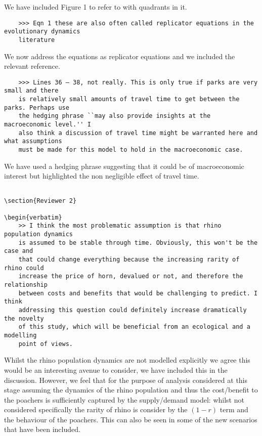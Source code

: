 \documentclass[10pt]{article}
\begin{document}
We have included Figure 1 to refer to with quadrants in it.

\begin{verbatim}
    >>> Eqn 1 these are also often called replicator equations in the evolutionary dynamics
    literature
\end{verbatim}

We now address the equations as replicator equations and we included the relevant
reference.

\begin{verbatim}
    >>> Lines 36 – 38, not really. This is only true if parks are very small and there
    is relatively small amounts of travel time to get between the parks. Perhaps use
    the hedging phrase ``may also provide insights at the macroeconomic level.'' I
    also think a discussion of travel time might be warranted here and what assumptions
    must be made for this model to hold in the macroeconomic case.
\end{verbatim}

We have used a hedging phrase suggesting that it could be of macroeconomic
interest but highlighted the non negligible effect of travel time.

\begin{verbatim}

\section{Reviewer 2}

\begin{verbatim}
    >> I think the most problematic assumption is that rhino population dynamics
    is assumed to be stable through time. Obviously, this won't be the case and
    that could change everything because the increasing rarity of rhino could
    increase the price of horn, devalued or not, and therefore the relationship
    between costs and benefits that would be challenging to predict. I think
    addressing this question could definitely increase dramatically the novelty
    of this study, which will be beneficial from an ecological and a modelling
    point of views.
\end{verbatim}

Whilst the rhino population dynamics are not modelled explicitly we agree this
would be an interesting avenue to consider, we have included this in the
discussion. However, we feel that for the purpose of analysis considered at this
stage assuming the dynamics of the rhino population and thus the cost/benefit to
the poachers is sufficiently captured by the supply/demand model: whilst not
considered specifically the rarity of rhino is consider by the \((1-r)\) term
and the behaviour of the poachers. This can also be seen in some of the new
scenarios that have been included.
\end{document}
